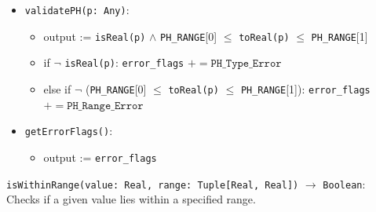 \documentclass[12pt, titlepage]{article}
\begin{document}
\begin{description}
    \item

    \begin{itemize}
      \item \texttt{validatePH(p: Any)}:
      \begin{itemize}
        \item output := \texttt{isReal(p)} $\land$ \texttt{PH\_RANGE}[0] $\leq$ \texttt{toReal(p)} $\leq$ \texttt{PH\_RANGE}[1]
        \item if $\lnot$ \texttt{isReal(p)}: \texttt{error\_flags} $\mathrel{+}= \texttt{PH\_Type\_Error}$
        \item else if $\lnot$ (\texttt{PH\_RANGE}[0] $\leq$ \texttt{toReal(p)} $\leq$ \texttt{PH\_RANGE}[1]): \texttt{error\_flags} $\mathrel{+}= \texttt{PH\_Range\_Error}$
      \end{itemize}
    \end{itemize}
    
    \item 
    
    \begin{itemize}
      \item \texttt{getErrorFlags()}:
        \begin{itemize}
          \item output := \texttt{error\_flags}
        \end{itemize}
    \end{itemize}    

  \item[Local Function:]
  \item
  \texttt{isWithinRange(value: Real, range: Tuple[Real, Real])} $\to$ \texttt{Boolean}:\\
  Checks if a given value lies within a specified range.
\end{description}
\end{document}
